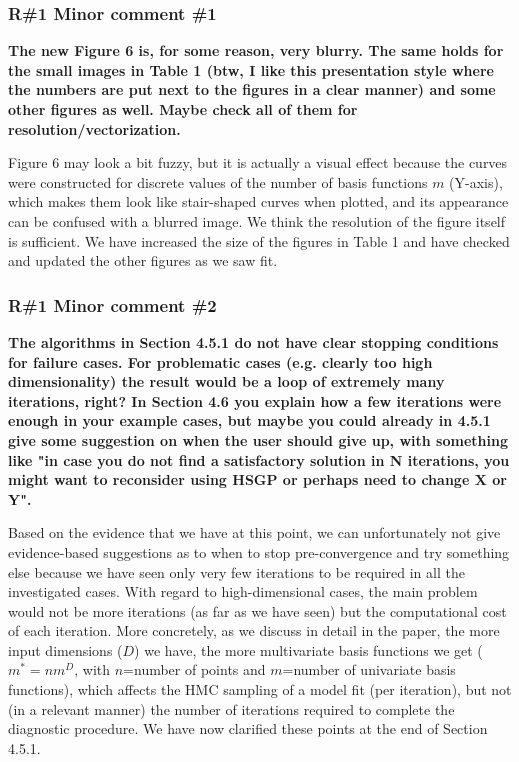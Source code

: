 \documentclass[11pt]{report}
\begin{document}
\subsubsection*{R\#1 Minor comment \#1}

\textbf{The new Figure 6 is, for some reason, very blurry. The same holds for the small images in Table 1 (btw, I like this presentation style where the numbers are put next to the figures in a clear manner) and some other figures as well. Maybe check all of them for resolution/vectorization.}

Figure 6 may look a bit fuzzy, but it is actually a visual effect because the curves were constructed for discrete values of the number of basis functions $m$ (Y-axis), which makes them look like stair-shaped curves when plotted, and its appearance can be confused with a blurred image. We think the resolution of the figure itself is sufficient. We have increased the size of the figures in Table 1 and have checked and updated the other figures as we saw fit.



\subsubsection*{R\#1 Minor comment \#2}

\textbf{The algorithms in Section 4.5.1 do not have clear stopping conditions for failure cases.  For problematic cases (e.g. clearly too high dimensionality) the result would be a loop of  extremely many iterations, right? In Section 4.6 you explain how a few iterations were enough in your example cases, but maybe you could already in 4.5.1 give some suggestion on when the user should give up, with something like "in case you do not find a satisfactory solution in N iterations, you might want to reconsider using HSGP or perhaps need to change X or Y".}

Based on the evidence that we have at this point, we can unfortunately not give evidence-based suggestions as to when to stop pre-convergence and try something else because we have seen only very few iterations to be required in all the investigated cases. With regard to high-dimensional cases, the main problem would not be more iterations (as far as we have seen) but the computational cost of each iteration. More concretely, as we discuss in detail in the paper, the more input dimensions ($D$) we have, the more multivariate basis functions we get ($m^*=nm^D$, with $n$=number of points and $m$=number of univariate basis functions), which affects the HMC sampling of a model fit (per iteration), but not (in a relevant manner) the number of iterations required to complete the diagnostic procedure. We have now clarified these points at the end of Section 4.5.1.
\end{document}
